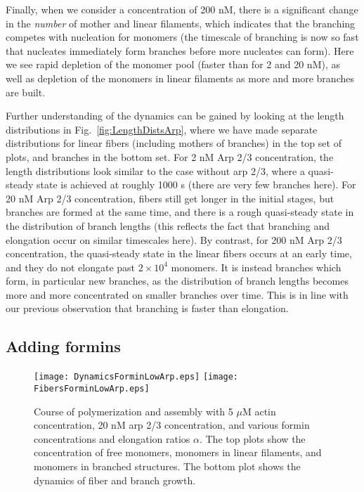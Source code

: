 \documentclass[11pt]{article}
\begin{document}
Finally, when we consider a concentration of 200 nM, there is a significant change in the \emph{number} of mother and linear filaments, which indicates that the branching competes with nucleation for monomers (the timescale of branching is now so fast that nucleates immediately form branches before more nucleates can form). Here we see rapid depletion of the monomer pool (faster than for 2 and 20 nM), as well as depletion of the monomers in linear filaments as more and more branches are built. 

Further understanding of the dynamics can be gained by looking at the length distributions in Fig.\ \ref{fig:LengthDistsArp}, where we have made separate distributions for linear fibers (including mothers of branches) in the top set of plots, and branches in the bottom set. For 2 nM Arp 2/3 concentration, the length distributions look similar to the case without arp 2/3, where a quasi-steady state is achieved at roughly 1000 s (there are very few branches here). For 20 nM Arp 2/3 concentration, fibers still get longer in the initial stages, but branches are formed at the same time, and there is a rough quasi-steady state in the distribution of branch lengths (this reflects the fact that branching and elongation occur on similar timescales here). By contrast, for 200 nM Arp 2/3 concentration, the quasi-steady state in the linear fibers occurs at an early time, and they do not elongate past $2 \times 10^4$ monomers. It is instead branches which form, in particular new branches, as the distribution of branch lengths becomes more and more concentrated on smaller branches over time. This is in line with our previous observation that branching is faster than elongation. 


\subsection{Adding formins}
\begin{figure}
\centering
\texttt{[image: DynamicsForminLowArp.eps]}
\texttt{[image: FibersForminLowArp.eps]}
\caption{\label{fig:ForminLowArp}Course of polymerization and assembly with 5 $\mu$M actin concentration, 20 nM arp 2/3 concentration, and various formin concentrations and elongation ratios $\alpha$. The top plots show the concentration of free monomers, monomers in linear filaments, and monomers in branched structures. The bottom plot shows the dynamics of fiber and branch growth. }
\end{figure}
\end{document}
